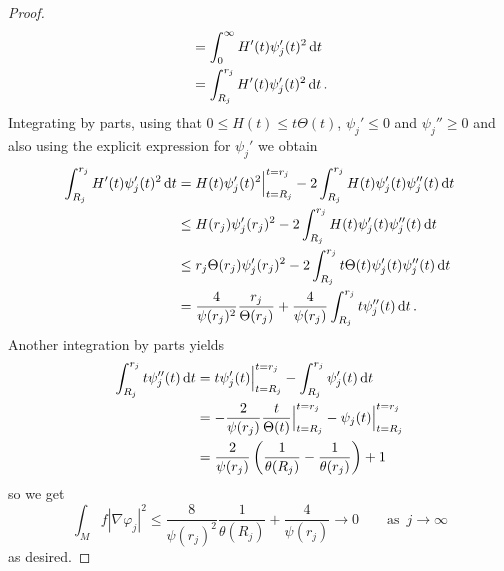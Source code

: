 \documentclass[10 pt,a4paper]{article}
\theoremstyle{definition}
\begin{document}
\begin{proof}
\begin{align*}
		& = \int_0^\infty H'(t) \psi_j'(t)^2 \, \mathrm{d} t \\
		& = \int_{R_j}^{r_j} H'(t) \psi_j'(t)^2 \, \mathrm{d} t \, .
	\end{align*}
	Integrating by parts, using that $0 \leq H(t)\leq t \Theta(t)$, $\psi_j' \leq 0$ and $\psi_j'' \geq 0$ and also using the explicit expression for $\psi_j'$ we obtain
	\begin{align*}
		\int_{R_j}^{r_j} H'(t) \psi_j'(t)^2 \, \mathrm{d} t & = H(t) \psi_j'(t)^2 \Big|_{t=R_j}^{t=r_j} - 2 \int_{R_j}^{r_j} H(t) \psi_j'(t) \psi_j''(t) \, \mathrm{d} t \\
		& \leq H(r_j) \psi_j'(r_j)^2 - 2 \int_{R_j}^{r_j} H(t) \psi_j'(t) \psi_j''(t) \, \mathrm{d} t \\
		& \leq r_j \Theta(r_j) \psi_j'(r_j)^2 - 2 \int_{R_j}^{r_j} t \Theta(t) \psi_j'(t) \psi_j''(t) \, \mathrm{d} t \\
		& = \frac{4}{\psi(r_j)^2} \frac{r_j}{\Theta(r_j)} + \frac{4}{\psi(r_j)} \int_{R_j}^{r_j} t \psi_j''(t) \, \mathrm{d} t \, .
	\end{align*}
	Another integration by parts yields
	\begin{align*}
		\int_{R_j}^{r_j} t \psi_j''(t) \, \mathrm{d} t & = t\psi_j'(t) \Big|_{t=R_j}^{t=r_j} - \int_{R_j}^{r_j} \psi_j'(t) \, \mathrm{d} t \\
		& = -\frac{2}{\psi(r_j)}\frac{t}{\Theta(t)} \Big|_{t=R_j}^{t=r_j} - \psi_j(t) \Big|_{t=R_j}^{t=r_j} \\
		& = \frac{2}{\psi(r_j)} \left(\frac{1}{\theta(R_j)} - \frac{1}{\theta(r_j)}\right) + 1
	\end{align*}
	so we get
	\[
	\int_M f|\nabla\varphi_j|^2 \leq \frac{8}{\psi(r_j)^2}\frac{1}{\theta(R_j)} + \frac{4}{\psi(r_j)} \to 0 \qquad \text{as } \, j \to \infty
	\]
	as desired.
\end{proof}
\end{document}
